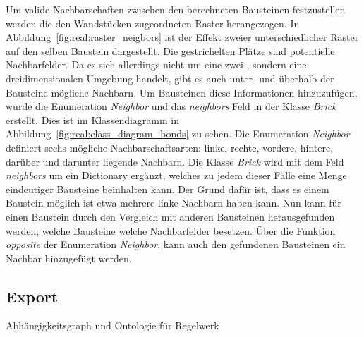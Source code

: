 Um valide Nachbarschaften zwischen den berechneten Bausteinen festzustellen werden die den Wandstücken zugeordneten Raster herangezogen.
In Abbildung~\ref{fig:real:raster_neigbors} ist der Effekt zweier unterschiedlicher Raster auf den selben Baustein dargestellt.
Die gestrichelten Plätze sind potentielle Nachbarfelder.
Da es sich allerdings nicht um eine zwei-, sondern eine dreidimensionalen Umgebung handelt, gibt es auch unter- und überhalb der Bausteine mögliche Nachbarn.
Um Bausteinen diese Informationen hinzuzufügen, wurde die Enumeration \textit{Neighbor} und das \textit{neighbors} Feld in der Klasse \textit{Brick} erstellt.
Dies ist im Klassendiagramm in Abbildung~\ref{fig:real:class_diagram_bonds} zu sehen.
Die Enumeration \textit{Neighbor} definiert sechs mögliche Nachbarschaftsarten: linke, rechte, vordere, hintere, darüber und darunter liegende Nachbarn.
Die Klasse \textit{Brick} wird mit dem Feld \textit{neighbors} um ein Dictionary ergänzt, welches zu jedem dieser Fälle eine Menge eindeutiger Bausteine beinhalten kann.
Der Grund dafür ist, dass es einem Baustein möglich ist etwa mehrere linke Nachbarn haben kann.
Nun kann für einen Baustein durch den Vergleich mit anderen Bausteinen herausgefunden werden, welche Bausteine welche Nachbarfelder besetzen.
Über die Funktion \textit{opposite} der Enumeration \textit{Neighbor}, kann auch den gefundenen Bausteinen ein Nachbar hinzugefügt werden.


\subsection{Export}
Abhängigkeitsgraph und Ontologie für Regelwerk
